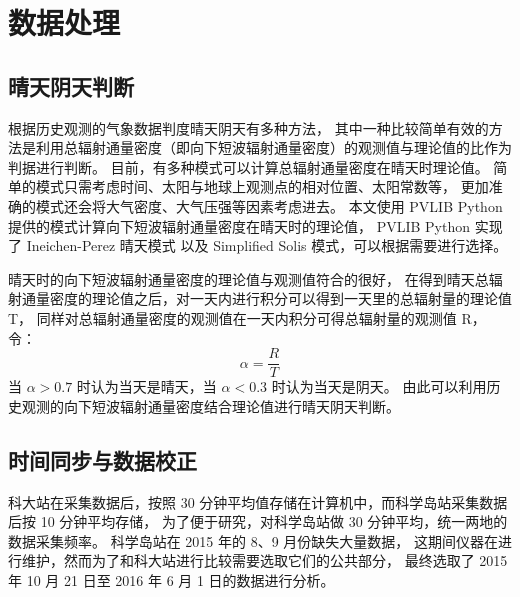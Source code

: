 \chapter{数据处理}
\section{晴天阴天判断}
根据历史观测的气象数据判度晴天阴天有多种方法，
其中一种比较简单有效的方法是利用总辐射通量密度（即向下短波辐射通量密度）的观测值与理论值的比作为判据进行判断。
目前，有多种模式可以计算总辐射通量密度在晴天时理论值。
简单的模式只需考虑时间、太阳与地球上观测点的相对位置、太阳常数等，
更加准确的模式还会将大气密度、大气压强等因素考虑进去。
本文使用 PVLIB Python \cite{pvlib-github}提供的模式计算向下短波辐射通量密度在晴天时的理论值，
PVLIB Python 实现了 Ineichen-Perez 晴天模式\cite{Ine02}
以及 Simplified Solis 模式\cite{Ineichen2008758}，可以根据需要进行选择。

晴天时的向下短波辐射通量密度的理论值与观测值符合的很好，
在得到晴天总辐射通量密度的理论值之后，对一天内进行积分可以得到一天里的总辐射量的理论值 T，
同样对总辐射通量密度的观测值在一天内积分可得总辐射量的观测值 R，令：
\begin{equation}
\alpha = \frac{R}{T}
\end{equation}
当 \(\alpha > 0.7\) 时认为当天是晴天，当 \(\alpha < 0.3\) 时认为当天是阴天。
由此可以利用历史观测的向下短波辐射通量密度结合理论值进行晴天阴天判断。

\section{时间同步与数据校正}
科大站在采集数据后，按照 30 分钟平均值存储在计算机中，而科学岛站采集数据后按 10 分钟平均存储，
为了便于研究，对科学岛站做 30 分钟平均，统一两地的数据采集频率。
科学岛站在 2015 年的 8、9 月份缺失大量数据，
这期间仪器在进行维护，然而为了和科大站进行比较需要选取它们的公共部分，
最终选取了 2015 年 10 月 21 日至 2016 年 6 月 1 日的数据进行分析。

